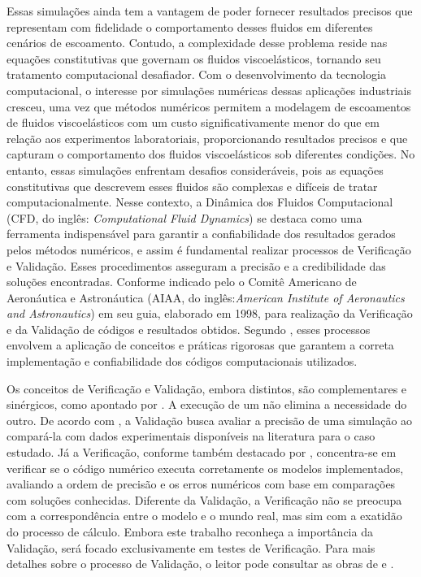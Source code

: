 Essas simulações ainda tem a vantagem de poder fornecer resultados precisos que representam com fidelidade o comportamento desses fluidos em diferentes cenários de escoamento. Contudo, a complexidade desse problema reside nas equações constitutivas que governam os fluidos viscoelásticos, tornando seu tratamento computacional desafiador. Com o desenvolvimento da tecnologia computacional, o interesse por simulações numéricas dessas aplicações industriais cresceu, uma vez que métodos numéricos permitem a modelagem de escoamentos de fluidos viscoelásticos com um custo significativamente menor do que em relação aos experimentos laboratoriais, proporcionando resultados precisos e que capturam o comportamento dos fluidos viscoelásticos sob diferentes condições. No entanto, essas simulações enfrentam desafios consideráveis, pois as equações constitutivas que descrevem esses fluidos são complexas e difíceis de tratar computacionalmente. Nesse contexto, a Dinâmica dos Fluidos Computacional (CFD, do inglês: \textit{Computational Fluid Dynamics}) se destaca como uma ferramenta indispensável para garantir a confiabilidade dos resultados gerados pelos métodos numéricos, e assim é fundamental realizar processos de Verificação e Validação. Esses procedimentos asseguram a precisão e a credibilidade das soluções encontradas. Conforme indicado pelo o Comitê Americano de Aeronáutica e Astronáutica (AIAA, do inglês:\textit{American Institute of Aeronautics and Astronautics})\cite{AIAA2002} em seu guia, elaborado em 1998, para realização da Verificação e da Validação de códigos e resultados obtidos. Segundo , esses processos envolvem a aplicação de conceitos e práticas rigorosas que garantem a correta implementação e confiabilidade dos códigos computacionais utilizados.

Os conceitos de Verificação e Validação, embora distintos, são complementares e sinérgicos, como apontado por . A execução de um não elimina a necessidade do outro. De acordo com , a Validação busca avaliar a precisão de uma simulação ao compará-la com dados experimentais disponíveis na literatura para o caso estudado. Já a Verificação, conforme também destacado por , concentra-se em verificar se o código numérico executa corretamente os modelos implementados, avaliando a ordem de precisão e os erros numéricos com base em comparações com soluções conhecidas. Diferente da Validação, a Verificação não se preocupa com a correspondência entre o modelo e o mundo real, mas sim com a exatidão do processo de cálculo. Embora este trabalho reconheça a importância da Validação, será focado exclusivamente em testes de Verificação. Para mais detalhes sobre o processo de Validação, o leitor pode consultar as obras de \cite{roacheartigo} e \cite{oberkampftech}.

